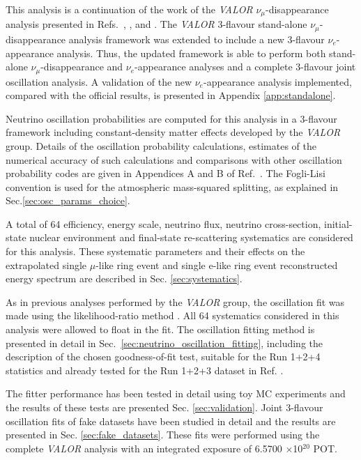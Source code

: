 This analysis is a continuation of the work of the {\em VALOR} $\nu_{\mu}$-disappearance analysis presented in
Refs.\ \cite{OurRun1DisappAnalysis}, \cite{OurRun12DisappAnalysis}, \cite{OurRun12DisappAnalysis3Flavour}
and \cite{OurRun123DisappAnalysis3Flavour}. 
The {\em VALOR} 3-flavour stand-alone $\nu_{\mu}$-disappearance analysis framework was extended 
to include a new 3-flavour $\nu_{e}$-appearance analysis. Thus, the updated framework is able to perform both stand-alone 
$\nu_{\mu}$-disappearance and $\nu_{e}$-appearance analyses and a complete 3-flavour joint oscillation analysis.
A validation of the new $\nu_{e}$-appearance analysis implemented, compared with the official results, 
is presented in Appendix \ref{app:standalone}.

Neutrino oscillation probabilities are computed for this analysis in a 3-flavour
framework including constant-density matter effects developed by the {\em VALOR} group.
Details of the oscillation probability calculations, estimates of the numerical accuracy of such
calculations and comparisons with other oscillation probability codes 
are given in Appendices A and B of Ref.\ \cite{OurRun123DisappAnalysis3Flavour}. The Fogli-Lisi convention 
is used for the atmospheric mass-squared splitting, as explained in Sec.\ref{sec:osc_params_choice}.

A total of 64 efficiency, energy scale, neutrino flux, neutrino cross-section, 
initial-state nuclear environment and final-state re-scattering systematics are considered for this analysis.
These systematic parameters and their effects 
on the extrapolated single $\mu$-like ring event and single e-like ring event reconstructed 
energy spectrum are described in Sec. \ref{sec:systematics}.

As in previous analyses performed by the {\em VALOR} group, 
the oscillation fit was made using the likelihood-ratio method \cite{StatAnalysisCowan}.
All 64 systematics \nolinebreak considered in this analysis were allowed to float in the fit.
The oscillation fitting method is presented in detail in Sec.\ \ref{sec:neutrino_oscillation_fitting}, including the description 
of the chosen goodness-of-fit test, suitable for the Run 1+2+4 statistics and already tested for the Run 1+2+3 dataset in Ref.
\cite{OurJointAnalysis}.


The fitter performance has been tested in detail using toy MC experiments 
and the results of these tests are presented Sec. \ref{sec:validation}.
Joint 3-flavour oscillation fits of fake datasets have been studied in detail and the results are presented in Sec. \ref{sec:fake_datasets}. These fits were performed using the complete {\em VALOR} analysis with an integrated 
exposure of 6.5700 $\times$10$^{20}$ POT. 


